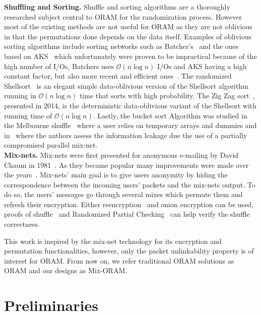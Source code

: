 \documentclass[USenglish,oneside,twocolumn]{article}
\begin{document}
\noindent\textbf{Shuffling and Sorting.}
Shuffle and sorting algorithms are a thoroughly researched subject central to ORAM for the randomization process. However most of the existing methods are not useful for ORAM as they are not oblivious in that the permutations done depends on the data itself.
Examples of oblivious sorting algorithms include sorting networks such as Batcher's~\cite{batcher1968sorting} and the ones based on AKS~\cite{ajtai19830} which unfortunately were proven to be impractical because of the high number of I/Os, Batchers uses $\mathcal{O}\left ( n \log n \right)$ I/Os and AKS having a high constant factor, but also more recent and efficient ones~\cite{paterson1990improved}.
The randomized Shellsort~\cite{goodrich2010randomized} is an elegant simple data-oblivious version of the Shellsort algorithm running in $\mathcal{O}\left ( n \log n \right)$ time that sorts with high probability.
The Zig Zag sort~\cite{goodrich2014zig}, presented in 2014, is the deterministic data-oblivious variant of the Shellsort with running time of $\mathcal{O}\left ( n \log n\right)$.
Lastly, the bucket sort Algorithm was studied in the Melbourne shuffle~\cite{ohrimenko2014melbourne} where a user relies on temporary arrays and dummies and in~\cite{goodrich2012anonymous} where the authors assess the information leakage due  the use of a partially compromised parallel mix-net.\\

\noindent\textbf{Mix-nets.}
Mix-nets were first presented for anonymous e-mailing by David Chaum in 1981~\cite{chaum1981untraceable}. As they became popular many improvements were made over the years~\cite{moller2003mixmaster,danezis2003mixminion,danezis2004minx,danezis2009sphinx}. Mix-nets' main goal is to give users anonymity by hiding the correspondence between the incoming users' packets and the mix-nets output. To do so, the users' messages go through several mixes which permute them and refresh their encryption. Either reencryption~\cite{wikstrom2006adaptively} and onion encryption can be used, proofs of shuffle~\cite{groth2007verifiable,groth2007non,bayer2012efficient} and Randomized Partial Checking~\cite{jakobsson2002making} can help verify the shuffle correctness.

This work is inspired by the mix-net technology for its encryption and permutation functionalities, however, only the packet unlinkability property is of interest for ORAM. From now on, we refer traditional ORAM solutions as ORAM and our designs as Mix-ORAM.
%
\section{Preliminaries}\label{Prelim}
%
\end{document}
